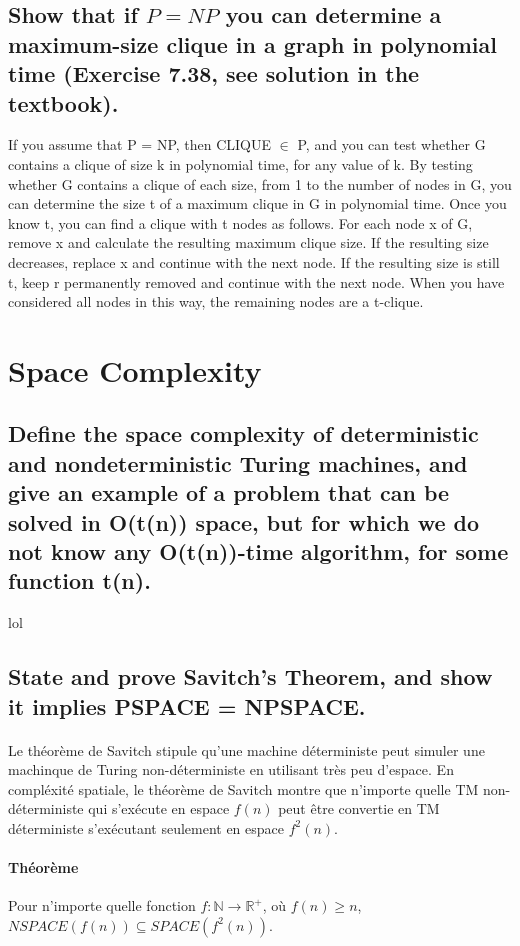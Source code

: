 \subsection{Show that if $P = NP$ you can determine a maximum-size clique in a graph in polynomial time (Exercise 7.38, see solution in the textbook).}
If you assume that P = NP, then CLIQUE $\in$ P, and you can test whether G contains a clique of size k in polynomial time, for any value of k. By testing whether G contains a clique of each size, from 1 to the number of nodes in G, you can determine the size t of a maximum clique in G in polynomial time. Once you know t, you can find a clique with t nodes as follows. For each node x of G, remove x and calculate the resulting maximum clique size. If the resulting size decreases, replace x and continue with the next node. If the resulting size is still t, keep r permanently removed and continue with the next node. When you have considered all nodes in this way, the remaining nodes are a t-clique.

\section{Space Complexity}

\subsection{Define the space complexity of deterministic and nondeterministic Turing machines, and give an example of a problem that can be solved in O(t(n)) space, but for which we do not know any O(t(n))-time algorithm, for some function t(n).}
lol

\subsection{State and prove Savitch's Theorem, and show it implies PSPACE = NPSPACE.}
\paragraph{}
Le théorème de Savitch stipule qu'une machine déterministe peut simuler une machinque de Turing non-déterministe en utilisant très peu d'espace.
En compléxité spatiale, le théorème de Savitch montre que n'importe quelle TM non-déterministe qui s'exécute en espace $f(n)$ peut être convertie en TM déterministe s'exécutant seulement en espace $f^{2}(n)$.

\paragraph{Théorème} 
Pour n'importe quelle fonction $f : \mathbb{N} \rightarrow \mathbb{R}^{+}$, où $f(n) \geq n$, $NSPACE(f(n)) \subseteq SPACE(f^{2}(n))$.
